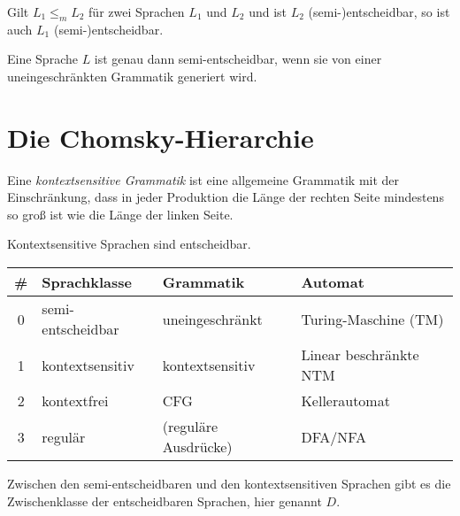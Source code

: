 \documentclass{cheat-sheet}
\begin{document}
\fbox{
  \begin{minipage}{8.5cm}
    \hfill\vspace{2.5cm}
  \end{minipage}
}

\begin{satz}
Gilt $L_{1} \le_{m} L_{2}$ für zwei Sprachen $L_{1}$ und $L_{2}$ und ist $L_{2}$ (semi-)entscheidbar, so ist auch $L_{1}$ (semi-)entscheidbar.
\end{satz}

\begin{satz}
Eine Sprache $L$ ist genau dann semi-entscheidbar, wenn sie von einer uneingeschränkten Grammatik generiert wird.
\end{satz}


\section{Die Chomsky-Hierarchie}

\begin{definition}
Eine \emph{kontextsensitive Grammatik} ist eine allgemeine Grammatik mit der Einschränkung, dass in jeder Produktion die Länge der rechten Seite mindestens so groß ist wie die Länge der linken Seite.
\end{definition}

\begin{satz}
Kontextsensitive Sprachen sind entscheidbar.
\end{satz}

\begin{center}
  \scriptsize
  \setlength{\tabcolsep}{2pt}
  \begin{tabular}{ c | l | l | l }
    \# & Sprachklasse & Grammatik & Automat \\
    \hline
    0 & semi-entscheidbar & uneingeschränkt & Turing-Maschine (TM) \\
    1 & kontextsensitiv & kontextsensitiv & Linear beschränkte NTM \\
    2 & kontextfrei & CFG & Kellerautomat \\
    3 & regulär & (reguläre Ausdrücke) & DFA/NFA
  \end{tabular}
\end{center}

\begin{bem}
  Zwischen den semi-entscheidbaren und den kontextsensitiven Sprachen gibt es die Zwischenklasse der entscheidbaren Sprachen, hier genannt $D$.
\end{bem}
\end{document}
